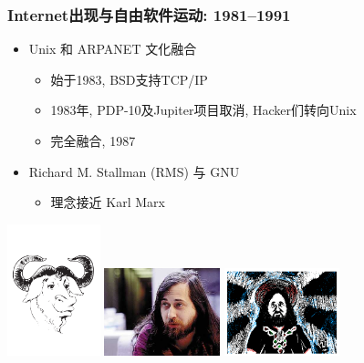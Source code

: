 \documentclass[compress]{beamer}
\begin{document}
\begin{frame}
\frametitle{Internet出现与自由软件运动: 1981--1991}
\begin{itemize}
\item Unix 和 ARPANET 文化融合
    \begin{itemize}
        \item 始于1983, BSD支持TCP/IP
        \item 1983年, PDP-10及Jupiter项目取消, Hacker们转向Unix
        \item 完全融合, 1987
    \end{itemize}
\item Richard M. Stallman (RMS) 与 GNU
    \begin{itemize}
    \item 理念接近 Karl Marx
    \end{itemize}
\end{itemize}
\hfill\includegraphics[height=1.5in]{gnu-head.pdf}\hfill%
\includegraphics[height=1.0in]{Richard_Matthew_Stallman.jpg}\hfill
\includegraphics[height=1.0in]{Stallman.png}\hfill

\end{frame}
\end{document}
